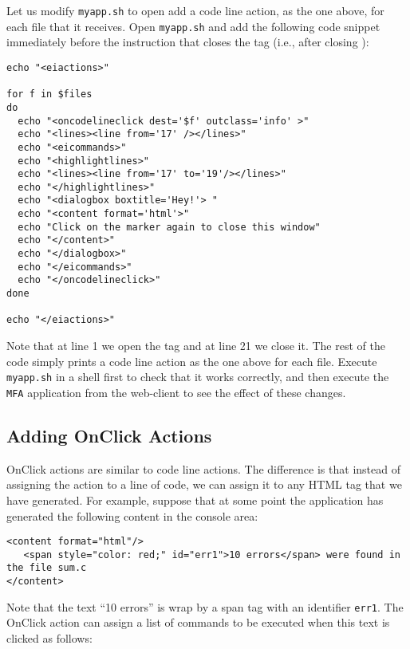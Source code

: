 Let us modify \texttt{myapp.sh} to open add a code line action, as the
one above, for each file that it receives. Open \texttt{myapp.sh} and
add the following code snippet immediately before the instruction that
closes the  tag (i.e., after closing ):

\medskip
\begin{lstlisting}[style=script]
echo "<eiactions>"

for f in $files 
do
  echo "<oncodelineclick dest='$f' outclass='info' >"
  echo "<lines><line from='17' /></lines>"
  echo "<eicommands>"
  echo "<highlightlines>"
  echo "<lines><line from='17' to='19'/></lines>"
  echo "</highlightlines>"
  echo "<dialogbox boxtitle='Hey!'> "
  echo "<content format='html'>"
  echo "Click on the marker again to close this window"
  echo "</content>"
  echo "</dialogbox>"
  echo "</eicommands>"
  echo "</oncodelineclick>"
done

echo "</eiactions>"
\end{lstlisting}


\medskip
\noindent
Note that at line 1 we open the tag  and at line 21 we
close it. The rest of the code simply prints a code line action as the
one above for each file.
%
Execute \texttt{myapp.sh} in a shell first to check that it works
correctly, and then execute the \texttt{MFA} application from the
web-client to see the effect of these changes.

\subsection{Adding OnClick Actions}

OnClick actions are similar to code line actions. The difference is
that instead of assigning the action to a line of code, we can assign
it to any HTML tag that we have generated.
%
For example, suppose that at some point the application has generated
the following content in the console area:

\medskip
\begin{lstlisting}
<content format="html"/>
   <span style="color: red;" id="err1">10 errors</span> were found in the file sum.c
</content>
\end{lstlisting}

\medskip
\noindent
Note that the text ``10 errors'' is wrap by a span tag with an
identifier \texttt{err1}. The OnClick action can assign a list of
commands to be executed when this text is clicked as follows:

